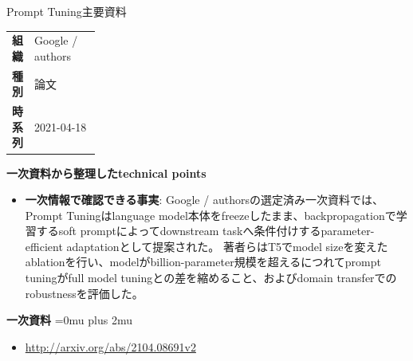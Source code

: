 \begin{technicalnote}{Prompt Tuning}{主要資料}
\begingroup
\begin{tabularx}{\linewidth}{@{}>{\bfseries}p{0.22\linewidth}X@{}}
組織 & Google / authors \\
種別 & 論文 \\
時系列 & 2021-04-18 \\
\end{tabularx}
\smallskip
{\bfseries 一次資料から整理したtechnical points}
\begin{itemize}[leftmargin=1.5em,itemsep=0.35em]
\item \textbf{一次情報で確認できる事実}: Google / authorsの選定済み一次資料では、Prompt Tuningはlanguage model本体をfreezeしたまま、backpropagationで学習するsoft promptによってdownstream taskへ条件付けするparameter-efficient adaptationとして提案された。 著者らはT5でmodel sizeを変えたablationを行い、modelがbillion-parameter規模を超えるにつれてprompt tuningがfull model tuningとの差を縮めること、およびdomain transferでのrobustnessを評価した。
\end{itemize}
\begin{minipage}{\linewidth}
\begin{samepage}
{\bfseries 一次資料}
\begingroup\sloppy
\Urlmuskip=0mu plus 2mu\relax
\begin{itemize}[leftmargin=1.5em,itemsep=0.25em]
\item {\scriptsize\url{http://arxiv.org/abs/2104.08691v2}}
\end{itemize}
\endgroup
\end{samepage}
\end{minipage}
\endgroup
\end{technicalnote}
\medskip

